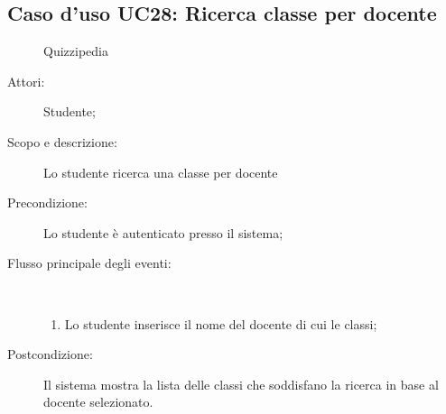 \subsection{Caso d'uso UC28: Ricerca classe per docente}
	\begin{figure}[H]
		\centering
		\begin{resizedtikzpicture}{\textwidth}
		\begin{umlsystem}[x=0, fill=lightgray!20]{Quizzipedia}
		\end{umlsystem}
		\end{resizedtikzpicture}
		\caption{}
	\end{figure}
\begin{description}
\item[Attori:] Studente;
\item[Scopo e descrizione:] Lo studente ricerca una classe per docente
      \item[Precondizione:] Lo studente è autenticato presso il sistema;

        \item[Flusso principale degli eventi:] \ 
 \begin{enumerate}
          \item Lo studente inserisce il nome del docente di cui le classi;

      \end{enumerate}
    \item[Postcondizione:] Il sistema mostra la lista delle classi che soddisfano la ricerca in base al docente selezionato.
  \end{description}
\hypertarget{UC29}{}
